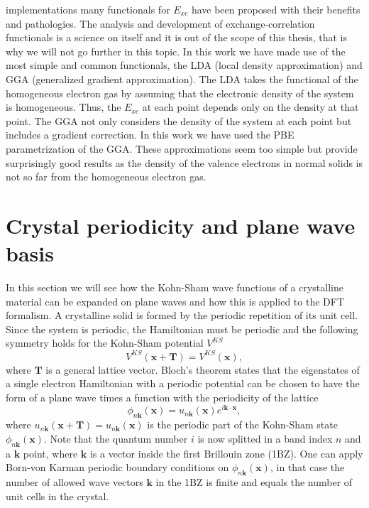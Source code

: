 implementations many functionals \cite{perdew1981self,perdew1996generalized} for $E_{xc}$ have been proposed with their benefits and pathologies. The analysis and development of exchange-correlation functionals is a science on
itself and it is out of the scope of this thesis, that is why we will not go further in this topic. In this work we have made use of the most simple and common functionals, the 
LDA\cite{perdew1981self} (local density approximation) and GGA\cite{perdew1996generalized} (generalized gradient approximation). The LDA takes the functional of the homogeneous electron gas\cite{pyne1992iterative} by assuming that 
the electronic density of the system is homogeneous. Thus, the $E_{xc}$ at each point depends only on the density at that point. The GGA not only considers the density of the system at each point but includes a gradient 
correction. In this work we have used the PBE\cite{perdew1996generalized} parametrization of the GGA. These approximations seem too simple but provide surprisingly good results as the density of the valence electrons in normal 
solids is not so far from the homogeneous electron gas\cite{martin2004electronic}.

\section{Crystal periodicity and plane wave basis}
\label{plane-wave-basis}
In this section we will see how the Kohn-Sham wave functions of a crystalline material can be expanded on plane waves and how this is applied to the DFT formalism. 
A crystalline solid is formed by the periodic repetition of its unit cell. Since the system is periodic, the Hamiltonian must be periodic and the following symmetry holds for the Kohn-Sham potential $V^{KS}$
\begin{equation}
 V^{KS}(\mathbf{x}+\mathbf{T})=V^{KS}(\mathbf{x}),
\end{equation}
where $\mathbf{T}$ is a general lattice vector. Bloch's theorem\cite{ashcroft1976solid} states that the eigenstates of a single electron Hamiltonian with a periodic potential can be chosen to have the form of a 
plane wave times a function with the periodicity of the lattice
\begin{equation}
 \phi_{n\mathbf{k}}(\mathbf{x})=u_{n\mathbf{k}}(\mathbf{x})e^{i\mathbf{k}\cdot\mathbf{x}},
\end{equation}
where $u_{n\mathbf{k}}(\mathbf{x}+\mathbf{T})=u_{n\mathbf{k}}(\mathbf{x})$ is the periodic part of the Kohn-Sham state $\phi_{n\mathbf{k}}(\mathbf{x})$. Note that the quantum number $i$ is now splitted in a band index $n$ 
and a $\mathbf{k}$ point, where $\mathbf{k}$ is a vector inside the first Brillouin zone (1BZ). One can apply Born-von Karman periodic boundary conditions\cite{ashcroft1976solid} on $\phi_{n\mathbf{k}}(\mathbf{x})$, in that case 
the number of allowed wave vectors $\mathbf{k}$ in the 1BZ is finite and equals the number of unit cells in the crystal. \\

